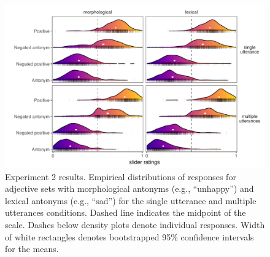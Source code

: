 \documentclass[floatsintext,doc]{apa6}
\begin{document}
\begin{figure}[h]
\centering \includegraphics[width=0.95\linewidth]{figs/expt2_ridges_wCIs} 
\caption{Experiment 2 results. Empirical distributions of responses for adjective sets with morphological antonyms (e.g., ``unhappy'') and lexical antonyms (e.g., ``sad'') for the single utterance and multiple utterances conditions. Dashed line indicates the midpoint of the scale. Dashes below density plots denote individual responses. Width of white rectangles denotes bootstrapped 95\% confidence intervals for the means.}
\label{fig:expt2-results}
\end{figure}
\end{document}
